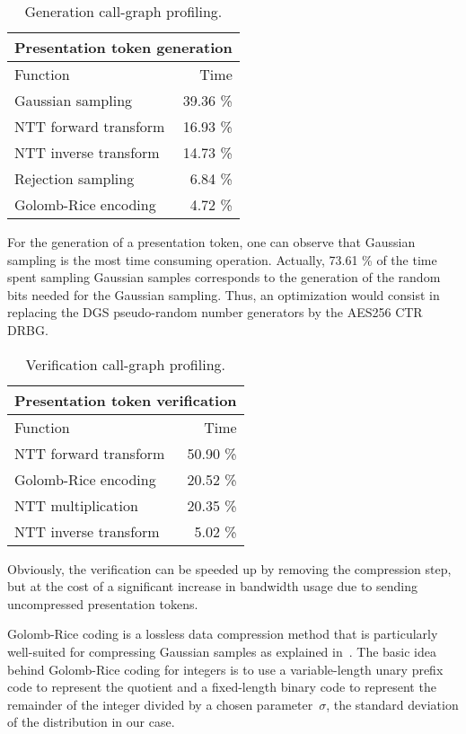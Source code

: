 \begin{table}[!ht]
\centering
\caption{Generation call-graph profiling.}
\label{tab:gprof}
\begin{tabular}{lr}
\toprule
\multicolumn{2}{c}{\textbf{Presentation token generation}} \\
\midrule
 Function & Time \\
\midrule
Gaussian sampling  & 39.36 \% \\
NTT forward transform & 16.93 \% \\
NTT inverse transform & 14.73 \% \\
Rejection sampling & 6.84 \% \\
Golomb-Rice encoding & 4.72 \% \\
\bottomrule
\end{tabular}
\end{table}

For the generation of a presentation token, one can observe that Gaussian sampling is the most time consuming operation. Actually, 73.61 \% of the time spent sampling Gaussian samples corresponds to the generation of the random bits needed for the Gaussian sampling. Thus, an optimization would consist in replacing the DGS pseudo-random number generators by the AES256 CTR DRBG.

\begin{table}[!ht]
\centering
\caption{Verification call-graph profiling.}
\label{tab:vprof}
\begin{tabular}{lr}
\toprule
\multicolumn{2}{c}{\textbf{Presentation token verification}} \\
\midrule
 Function & Time \\
\midrule
NTT forward transform & 50.90 \% \\
Golomb-Rice encoding & 20.52 \% \\
NTT multiplication & 20.35 \% \\
NTT inverse transform & 5.02 \% \\
\bottomrule
\end{tabular}
\end{table}

Obviously, the verification can be speeded up by removing the compression step, but at the cost of a significant increase in bandwidth usage due to sending uncompressed presentation tokens.

Golomb-Rice coding is a lossless data compression method that is particularly well-suited for compressing Gaussian samples as explained in~\cite{C:ETWY22}. The basic idea behind Golomb-Rice coding for integers is to use a variable-length unary prefix code to represent the quotient and a fixed-length binary code to represent the remainder of the integer divided by a chosen parameter~$\sigma$, the standard deviation of the distribution in our case.

